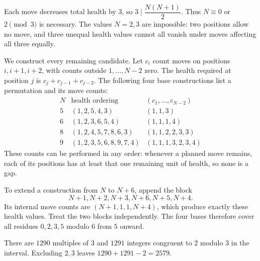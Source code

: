 Each move decreases total health by $3$, so $3\mid\dfrac{N(N+1)}{2}$. Thus $N\equiv0$ or $2\pmod3$ is necessary. The values $N=2,3$ are impossible: two positions allow no move, and three unequal health values cannot all vanish under moves affecting all three equally.

We construct every remaining candidate. Let $c_i$ count moves on positions $i,i+1,i+2$, with counts outside $1,\ldots,N-2$ zero. The health required at position $j$ is $c_j+c_{j-1}+c_{j-2}$. The following four base constructions list a permutation and its move counts:
\[
\begin{array}{c|l|l}
N&\text{health ordering}&(c_1,\ldots,c_{N-2})\\ \hline
5&(1,2,5,4,3)&(1,1,3)\\
6&(1,2,3,6,5,4)&(1,1,1,4)\\
8&(1,2,4,5,7,8,6,3)&(1,1,2,2,3,3)\\
9&(1,2,3,5,6,8,9,7,4)&(1,1,1,3,2,3,4)
\end{array}
\]
These counts can be performed in any order: whenever a planned move remains, each of its positions has at least that one remaining unit of health, so none is a gap.

To extend a construction from $N$ to $N+6$, append the block
\[
N+1,N+2,N+3,N+6,N+5,N+4.
\]
Its internal move counts are $(N+1,1,1,N+4)$, which produce exactly these health values. Treat the two blocks independently. The four bases therefore cover all residues $0,2,3,5$ modulo $6$ from $5$ onward.

There are $1290$ multiples of $3$ and $1291$ integers congruent to $2$ modulo $3$ in the interval. Excluding $2,3$ leaves $\boxed{1290+1291-2=2579}$.
